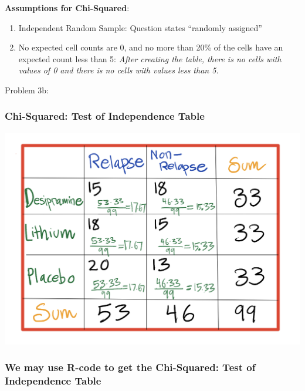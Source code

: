 \documentclass[
]{article}
\begin{document}
\textbf{Assumptions for Chi-Squared}:

\begin{enumerate}
\def\labelenumi{\arabic{enumi}.}
\item
  Independent Random Sample: Question states ``randomly assigned''
\item
  No expected cell counts are 0, and no more than 20\% of the cells have
  an expected count less than 5: \emph{After creating the table, there
  is no cells with values of 0 and there is no cells with values less
  than 5.}
\end{enumerate}

\newpage

Problem 3b:

\hypertarget{chi-squared-test-of-independence-table}{%
\subsubsection{Chi-Squared: Test of Independence
Table}\label{chi-squared-test-of-independence-table}}

\begin{center}\includegraphics[width=0.5\linewidth]{problem3} \end{center}

\hypertarget{we-may-use-r-code-to-get-the-chi-squared-test-of-independence-table}{%
\subsubsection{We may use R-code to get the Chi-Squared: Test of
Independence
Table}\label{we-may-use-r-code-to-get-the-chi-squared-test-of-independence-table}}
\end{document}

